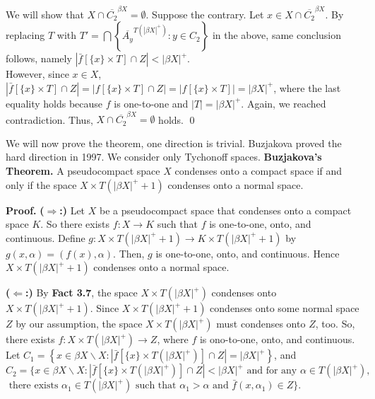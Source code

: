\documentclass{article}
\begin{document}
\vskip 10pt

We will show that $X\cap \overline{C_2}^{\beta X}=\emptyset$. Suppose the contrary. Let $x\in X \cap \overline{C_2}^{\beta X}$. By replacing $T$ with $T'=\bigcap \left\{ \overline{A_y}^{T(|\beta X|^+)} : y\in C_2 \right\}$ in the above, same conclusion follows, namely  $\left|\bar{f}\left[\{x\} \times T \right] \cap Z \right| < \left|\beta X \right|^+$. \\

However, since $x\in X$, $\left|\bar{f}\left[\{x\} \times T \right] \cap Z \right| =\left| f\left[\{x\} \times T \right]\cap Z \right| = \left| f\left[\{x\} \times T\right]\right|= \left|\beta X \right|^+$, where the last equality holds because $f$ is one-to-one and $|T|=|\beta X|^+$. 
Again, we reached contradiction. Thus, $X\cap \overline{C_2}^{\beta X}=\emptyset$ holds. \qed



\vskip 40pt


We will now prove the theorem, one direction is trivial. Buzjakova proved the hard direction in 1997. We consider only Tychonoff spaces. 
\vskip 20pt
\textbf{Buzjakova's Theorem.} A pseudocompact space $X$ condenses onto a compact space if and only if the space $X\times T(\left| \beta X \right| ^+ +1)$ condenses onto a normal space. 
\vskip 15pt

\textbf{Proof.}\vskip 10pt
\textbf{($\Rightarrow$:) } Let $X$ be a pseudocompact space that condenses onto a compact space $K$. So there exists $f:X\rightarrow K$ such that $f$ is one-to-one, onto, and continuous. Define $g: X\times T(|\beta X|^+ +1) \rightarrow K\times T(|\beta X|^+ +1)$ by $g(x,\alpha)=(f(x), \alpha).$ Then, $g$ is one-to-one, onto, and continuous. Hence $X\times T(|\beta X|^+ +1)$ condenses onto a normal space. 


\vskip 20pt

\textbf{($\Leftarrow$:)} By \textbf{Fact 3.7}, the space $X\times T(|\beta X|^+)$ condenses onto $X\times T(|\beta X|^+ +1).$ 
Since $X\times T(|\beta X|^+ +1)$ condenses onto some normal space $Z$ by our assumption, the space $X\times T(|\beta X|^+)$ must condenses onto $Z$, too. 
So, there exists $f: X\times T(|\beta X|^+) \rightarrow Z$, where $f$ is ono-to-one, onto, and continuous. 
Let \vskip 10pt
$C_1=\left\{x\in  \beta X \backslash X: |\bar{f}[\{x\} \times T(|\beta X|^+)] \cap Z|=|\beta X|^+\right\}$, and \vskip 10pt
$C_2=\{x\in \beta X\backslash X: \left|\bar{f}[\{x\}\times T(|\beta X|^+)]\cap Z\right|<|\beta X|^+ \mbox{ and for any }\alpha\in T(|\beta X|^+),$\\ $\mbox{ there exists }\alpha_1\in T(|\beta X|^+)\mbox{ such that }\alpha_1 >\alpha \mbox{ and } \bar{f}(x,\alpha_1) \in Z \}.$
\end{document}
